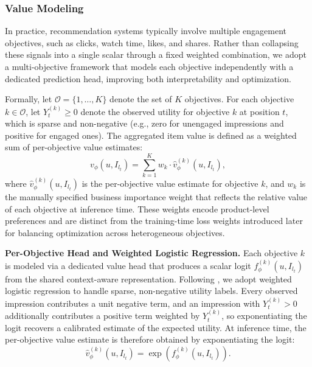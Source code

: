 \documentclass[sigconf]{acmart}
\begin{document}
\subsubsection{Value Modeling}
In practice, recommendation systems typically involve multiple engagement objectives, such as clicks, watch time, likes, and shares. Rather than collapsing these signals into a single scalar through a fixed weighted combination, we adopt a multi-objective framework that models each objective independently with a dedicated prediction head, improving both interpretability and optimization.

Formally, let $\mathcal{O} = \{1, \dots, K\}$ denote the set of $K$ objectives. For each objective $k \in \mathcal{O}$, let $Y_t^{(k)} \geq 0$ denote the observed utility for objective $k$ at position $t$, which is sparse and non-negative (e.g., zero for unengaged impressions and positive for engaged ones). The aggregated item value is defined as a weighted sum of per-objective value estimates:
\begin{equation}
\label{eq:item_value}
v_\phi(u, I_{l_t}) = \sum_{k=1}^{K} w_k \cdot \hat{v}_\phi^{(k)}(u, I_{l_t}),
\end{equation}
where $\hat{v}_\phi^{(k)}(u, I_{l_t})$ is the per-objective value estimate for objective $k$, and $w_k$ is the manually specified business importance weight that reflects the relative value of each objective at inference time. These weights encode product-level preferences and are distinct from the training-time loss weights introduced later for balancing optimization across heterogeneous objectives. 

\vspace{0.5em}
\noindent\textbf{Per-Objective Head and Weighted Logistic Regression.}
Each objective $k$ is modeled via a dedicated value head that produces a scalar logit $f_\phi^{(k)}(u, I_{l_t})$ from the shared context-aware representation. Following \citet{covington2016deep}, we adopt weighted logistic regression to handle sparse, non-negative utility labels. Every observed impression contributes a unit negative term, and an impression with $Y_t^{(k)} > 0$ additionally contributes a positive term weighted by $Y_t^{(k)}$, so exponentiating the logit recovers a calibrated estimate of the expected utility. At inference time, the per-objective value estimate is therefore obtained by exponentiating the logit:
\begin{equation}
\hat{v}_\phi^{(k)}(u, I_{l_t}) = \exp\!\left(f_\phi^{(k)}(u, I_{l_t})\right).
\end{equation}
\end{document}
